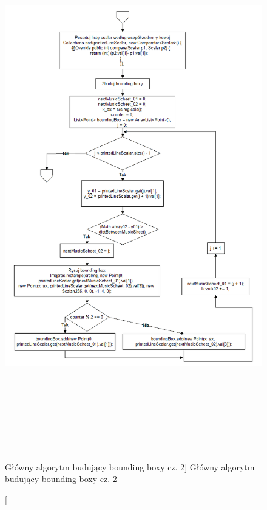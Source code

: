 \documentclass[a4paper,12pt]{article}
\begin{document}
	        \begin{figure}[!ht]  
			    \begin{center}
				    \includegraphics[height=23cm] {image//algorithm//majorProcesing_02.png} 
			    \end{center}
			    \caption
    			    [Główny algorytm budujący bounding boxy cz. 2]  
    			    {Główny algorytm budujący bounding boxy cz. 2}  
		    \end{figure} 
		
\end{document}
